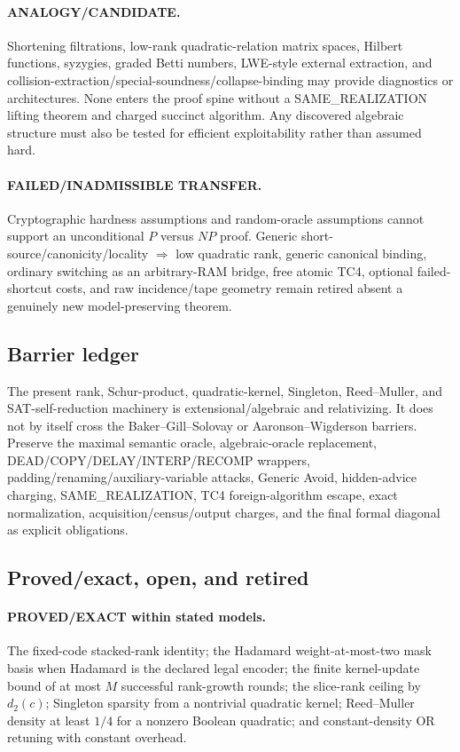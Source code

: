 \documentclass[11pt]{article}
\begin{document}
\paragraph{ANALOGY/CANDIDATE.}
Shortening filtrations, low-rank quadratic-relation matrix spaces, Hilbert
functions, syzygies, graded Betti numbers, LWE-style external extraction,
and collision-extraction/special-soundness/collapse-binding may provide
diagnostics or architectures.  None enters the proof spine without a
SAME\_REALIZATION lifting theorem and charged succinct algorithm.  Any
discovered algebraic structure must also be tested for efficient
exploitability rather than assumed hard.

\paragraph{FAILED/INADMISSIBLE TRANSFER.}
Cryptographic hardness assumptions and random-oracle assumptions cannot
support an unconditional \(P\) versus \(NP\) proof.  Generic
short-source/canonicity/locality \(\Rightarrow\) low quadratic rank,
generic canonical binding, ordinary switching as an arbitrary-RAM bridge,
free atomic TC4, optional failed-shortcut costs, and raw incidence/tape
geometry remain retired absent a genuinely new model-preserving theorem.

\subsection{Barrier ledger}

The present rank, Schur-product, quadratic-kernel, Singleton, Reed--Muller,
and SAT-self-reduction machinery is extensional/algebraic and relativizing.
It does not by itself cross the Baker--Gill--Solovay or
Aaronson--Wigderson barriers.  Preserve the maximal semantic oracle,
algebraic-oracle replacement, DEAD/COPY/DELAY/INTERP/RECOMP wrappers,
padding/renaming/auxiliary-variable attacks, Generic Avoid, hidden-advice
charging, SAME\_REALIZATION, TC4 foreign-algorithm escape, exact
normalization, acquisition/census/output charges, and the final formal
diagonal as explicit obligations.

\subsection{Proved/exact, open, and retired}

\paragraph{PROVED/EXACT within stated models.}
The fixed-code stacked-rank identity; the Hadamard weight-at-most-two mask
basis when Hadamard is the declared legal encoder; the finite
kernel-update bound of at most \(M\) successful rank-growth rounds; the
slice-rank ceiling by \(d_2(c)\); Singleton sparsity from a nontrivial
quadratic kernel; Reed--Muller density at least \(1/4\) for a nonzero
Boolean quadratic; and constant-density OR retuning with constant overhead.
\end{document}
